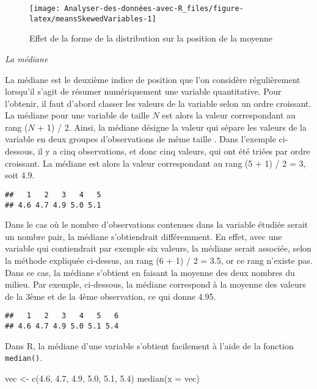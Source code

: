 \documentclass[
]{book}
\newenvironment{Shaded}{\begin{snugshade}}{\end{snugshade}}
\newcommand{\AttributeTok}[1]{\textcolor[rgb]{0.77,0.63,0.00}{#1}}
\newcommand{\FloatTok}[1]{\textcolor[rgb]{0.00,0.00,0.81}{#1}}
\newcommand{\FunctionTok}[1]{\textcolor[rgb]{0.00,0.00,0.00}{#1}}
\newcommand{\NormalTok}[1]{#1}
\newcommand{\OtherTok}[1]{\textcolor[rgb]{0.56,0.35,0.01}{#1}}
\begin{document}
\begin{figure}

{\centering \texttt{[image: Analyser-des-données-avec-R\_files/figure-latex/meansSkewedVariables-1]} 

}

\caption{Effet de la forme de la distribution sur la position de la moyenne}\label{fig:meansSkewedVariables}
\end{figure}

\emph{La médiane}

La médiane est le deuxième indice de position que l'on considère régulièrement lorsqu'il s'agit de résumer numériquement une variable quantitative. Pour l'obtenir, il faut d'abord classer les valeurs de la variable selon un ordre croissant. La médiane pour une variable de taille \(N\) est alors la valeur correspondant au rang (\(N\) + 1) / 2. Ainsi, la médiane désigne la valeur qui sépare les valeurs de la variable en deux groupes d'observations de même taille \autocite{chatellierMoyenneMedianeLeurs2003}. Dans l'exemple ci-dessous, il y a cinq observations, et donc cinq valeurs, qui ont été triées par ordre croissant. La médiane est alors la valeur correspondant au rang (5 + 1) / 2 = 3, soit 4.9.

\begin{verbatim}
##   1   2   3   4   5 
## 4.6 4.7 4.9 5.0 5.1
\end{verbatim}

Dans le cas où le nombre d'observations contenues dans la variable étudiée serait un nombre pair, la médiane s'obtiendrait différemment. En effet, avec une variable qui contiendrait par exemple six valeurs, la médiane serait associée, selon la méthode expliquée ci-dessus, au rang (6 + 1) / 2 = 3.5, or ce rang n'existe pas. Dans ce cas, la médiane s'obtient en faisant la moyenne des deux nombres du milieu. Par exemple, ci-dessous, la médiane correspond à la moyenne des valeurs de la 3ème et de la 4ème observation, ce qui donne 4.95.

\begin{verbatim}
##   1   2   3   4   5   6 
## 4.6 4.7 4.9 5.0 5.1 5.4
\end{verbatim}

Dans R, la médiane d'une variable s'obtient facilement à l'aide de la fonction \texttt{median()}.

\begin{Shaded}
\begin{Highlighting}[]
\NormalTok{vec }\OtherTok{\textless{}{-}} \FunctionTok{c}\NormalTok{(}\FloatTok{4.6}\NormalTok{, }\FloatTok{4.7}\NormalTok{, }\FloatTok{4.9}\NormalTok{, }\FloatTok{5.0}\NormalTok{, }\FloatTok{5.1}\NormalTok{, }\FloatTok{5.4}\NormalTok{)}
\FunctionTok{median}\NormalTok{(}\AttributeTok{x =}\NormalTok{ vec)}
\end{Highlighting}
\end{Shaded}
\end{document}
